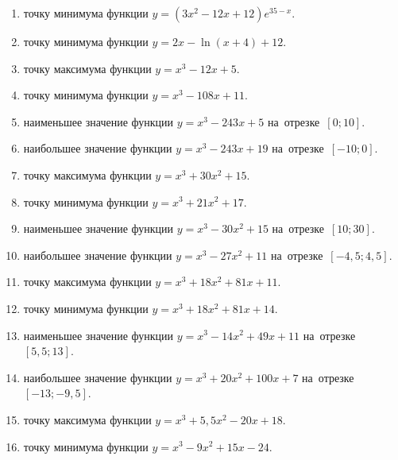 \documentclass[a4paper,10pt]{article}
\begin{document}
\begin{enumerate}
\item {} точку минимума функции $y=\left(3x^2-12x+12\right){{e}^{35-x}}$.

\item {} точку минимума функции $y=2x-\ln \left(x+4\right)+12$.

\item {} точку максимума функции $y=x^3 -12x +5$.

\item {} точку минимума функции $y=x^3 -108x+11$.

\item {} наименьшее значение функции $y=x^3 -243x+5$ на~отрезке~$\left[0;10\right]$.

\item {} наибольшее значение функции $y=x^3 -243x+19$ на~отрезке~$\left[-10;0\right]$.

\item {} точку максимума функции $y=x^3 +30x^2+15$.

\item {} точку минимума функции $y=x^3 +21x^2+17$.

\item {} наименьшее значение функции $y=x^3 -30x^2+15$ на~отрезке~$\left[10;30\right]$.

\item {} наибольшее значение функции $y=x^3 -27x^2+11$ на~отрезке~$\left[-4,5;4,5\right]$.

\item {} точку максимума функции $y=x^3 +18x^2+81x+11$.

\item {} точку минимума функции $y=x^3 +18x^2+81x+14$.

\item {} наименьшее значение функции $y=x^3 -14x^2+49x+11$ на~отрезке~$\left[5,5;13\right]$.

\item {} наибольшее значение функции $y=x^3 +20x^2+100x+7$ на~отрезке~$\left[-13;-9,5\right]$.

\item {} точку максимума функции $y=x^3 +5,5x^2-20x+18$.

\item {} точку минимума функции $y=x^3 -9x^2+15x-24$.


\end{enumerate}
\end{document}
